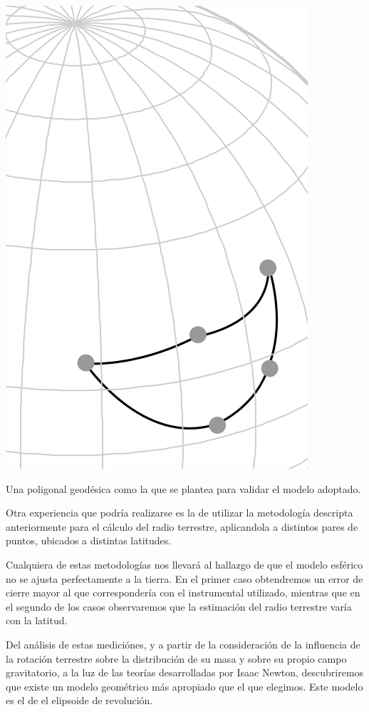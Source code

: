 \documentclass{tufte-book}
\begin{document}
\begin{marginfigure}
  \label{fig:poligonalgeodesica}
  \includegraphics{./imgs/geopoly.png}
  \caption{Una poligonal geodésica como la que se plantea para validar el modelo adoptado.}
\end{marginfigure}

Otra experiencia que podría realizarse es la de utilizar la metodología descripta anteriormente para el
cálculo del radio terrestre, aplicandola a distintos pares de puntos, ubicados a distintas latitudes.

Cualquiera de estas metodologías nos llevará al hallazgo de que el modelo esférico no se ajusta
perfectamente a la tierra. En el primer caso obtendremos un error de cierre mayor al que correspondería
con el instrumental utilizado, mientras que en el segundo de los casos observaremos que la estimación
del radio terrestre varía con la latitud.

Del análisis de estas mediciónes, y a partir de la consideración de la influencia de la rotación terrestre
sobre la distribución de su masa y sobre su propio campo gravitatorio, a la luz de las teorías desarrolladas
por Isaac Newton, descubriremos que existe un modelo geométrico más apropiado que el que elegimos.
Este modelo es el de el elipsoide de revolución.
\end{document}
